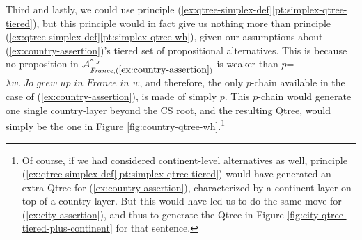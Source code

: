 \begin{exe}
	\label{ex:country-gran-alt2}
\end{exe} 

Third and lastly, we could use principle (\ref{ex:qtree-simplex-def}\ref{pt:simplex-qtree-tiered}), but this principle would in fact give us nothing more than principle (\ref{ex:qtree-simplex-def}\ref{pt:simplex-qtree-wh}), given our assumptions about (\ref{ex:country-assertion})'s tiered set of propositional alternatives. This is because no proposition in $\mathcal{A}_{\textit{France}, (\ref{ex:country-assertion})}^{\sim_g}$ is weaker than $p$=\textit{$\lambda w. \ \textit{Jo grew up in France in $w$}$}, and therefore, the only $p$-chain available in the case of (\ref{ex:country-assertion}), is made of simply $p$. This $p$-chain would generate one single country-layer beyond the CS root, and the resulting Qtree, would simply be the one in Figure \ref{fig:country-qtree-wh}.\footnote{Of course, if we had considered continent-level alternatives as well, principle (\ref{ex:qtree-simplex-def}\ref{pt:simplex-qtree-tiered}) would have generated an extra Qtree for (\ref{ex:country-assertion}), characterized by a continent-layer on top of a country-layer. But this would have led us to do the same move for (\ref{ex:city-assertion}), and thus to generate the Qtree in Figure \ref{fig:city-qtree-tiered-plus-continent} for that sentence.}

